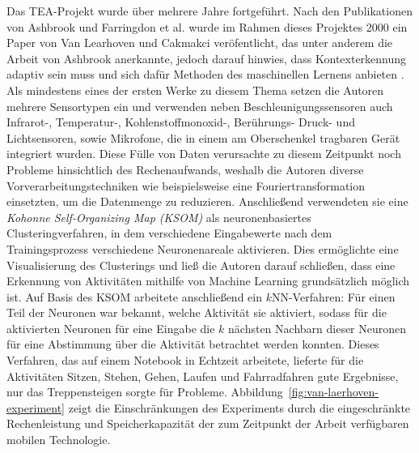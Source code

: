 Das TEA-Projekt wurde über mehrere Jahre fortgeführt. Nach den Publikationen von Ashbrook und Farringdon et al. wurde im Rahmen dieses Projektes 2000 ein Paper von Van Learhoven und Cakmakci veröfentlicht, das unter anderem die Arbeit von Ashbrook anerkannte, jedoch darauf hinwies, dass Kontexterkennung adaptiv sein muss und sich dafür Methoden des maschinellen Lernens anbieten \cite{VanLaerhoven2000}. Als mindestens eines der ersten Werke zu diesem Thema setzen die Autoren mehrere Sensortypen ein und verwenden neben Beschleunigungssensoren auch Infrarot-, Temperatur-, Kohlenstoffmonoxid-, Berührungs- Druck- und Lichtsensoren, sowie Mikrofone, die in einem am Oberschenkel tragbaren Gerät integriert wurden. 
Diese Fülle von Daten verursachte zu diesem Zeitpunkt noch Probleme hinsichtlich des Rechenaufwands, weshalb die Autoren diverse Vorverarbeitungstechniken wie beispielsweise eine Fouriertransformation einsetzten, um die Datenmenge zu reduzieren. Anschließend verwendeten sie eine \textit{Kohonne Self-Organizing Map (KSOM)} als neuronenbasiertes Clusteringverfahren, in dem verschiedene Eingabewerte nach dem Trainingsprozess verschiedene Neuronenareale aktivieren. Dies ermöglichte eine Visualisierung des Clusterings und ließ die Autoren darauf schließen, dass eine Erkennung von Aktivitäten mithilfe von Machine Learning grundsätzlich möglich ist. Auf Basis des KSOM arbeitete anschließend ein $k$NN-Verfahren: Für einen Teil der Neuronen war bekannt, welche Aktivität sie aktiviert, sodass für die aktivierten Neuronen für eine Eingabe die $k$ nächsten Nachbarn dieser Neuronen für eine Abstimmung über die Aktivität betrachtet werden konnten. Dieses Verfahren, das auf einem Notebook in Echtzeit arbeitete, lieferte für die Aktivitäten Sitzen, Stehen, Gehen, Laufen und Fahrradfahren gute Ergebnisse, nur das Treppensteigen sorgte für Probleme. Abbildung~\ref{fig:van-laerhoven-experiment} zeigt die Einschränkungen des Experiments durch die eingeschränkte Rechenleistung und Speicherkapazität der zum Zeitpunkt der Arbeit verfügbaren mobilen Technologie.

